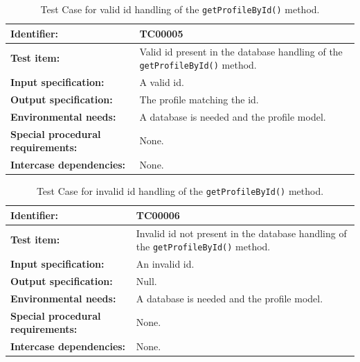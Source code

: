 \begin{table}[H]
	\centering
		\begin{tabular}{| p{4.5cm} | m{9cm} |}
			\hline
			\textbf{Identifier:} 					& TC00005 \\ \hline
			\textbf{Test item:}						& Valid id present in the database handling of the \texttt{getProfileById()} method. \\ \hline
			\textbf{Input specification:}			& A valid id. \\ \hline
			\textbf{Output specification:} 			& The profile matching the id. \\ \hline
			\textbf{Environmental needs:}			& A database is needed and the profile model. \\ \hline
			\textbf{Special procedural requirements:}	& None. \\ \hline
			\textbf{Intercase dependencies:}			& None. \\ \hline
		\end{tabular}
	\caption{Test Case for valid id handling of the \texttt{getProfileById()} method.}
	\label{tab:TestCase_ValidIdHandling}
\end{table}

\begin{table}[H]
	\centering
		\begin{tabular}{| p{4.5cm} | m{9cm} |}
			\hline
			\textbf{Identifier:} 					& TC00006 \\ \hline
			\textbf{Test item:}						& Invalid id not present in the database handling of the \texttt{getProfileById()} method. \\ \hline
			\textbf{Input specification:}			& An invalid id. \\ \hline
			\textbf{Output specification:} 			& Null. \\ \hline
			\textbf{Environmental needs:}			& A database is needed and the profile model. \\ \hline
			\textbf{Special procedural requirements:}	& None. \\ \hline
			\textbf{Intercase dependencies:}			& None. \\ \hline
		\end{tabular}
	\caption{Test Case for invalid id handling of the \texttt{getProfileById()} method.}
	\label{tab:TestCase_InvalidIdHandling}
\end{table}

